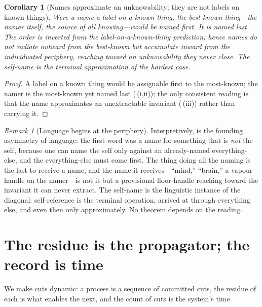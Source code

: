 \documentclass[twocolumn,11pt,a4paper]{article}
\theoremstyle{sup}
\newtheorem{corollary}[theorem]{Corollary}
\theoremstyle{definition}
\theoremstyle{remark}
\newtheorem{remark}[theorem]{Remark}
\begin{document}
\begin{corollary}[Names approximate an unknowability; they are not labels on
known things]
\label{cor:names-approx}
Were a name a label on a \emph{known} thing, the best-known thing---the namer
itself, the source of all knowing---would be named first. It is named last. The
order is inverted from the label-on-a-known-thing prediction; hence names do not
radiate outward from the best-known but accumulate inward from the individuated
periphery, reaching toward an unknowability they never close. The self-name is
the terminal approximation of the hardest case.
\end{corollary}

\begin{proof}
A label on a known thing would be assignable first to the most-known; the namer
is the most-known yet named last (\,(i,ii)); the only
consistent reading is that the name approximates an unextractable invariant
(\,(iii)) rather than carrying it.
\end{proof}

\begin{remark}[Language begins at the periphery]
\label{rem:periphery}
Interpretively,  is the founding asymmetry of language:
the first word was a name for something that is \emph{not} the self, because one
can name the self only against an already-named everything-else, and the
everything-else must come first. The thing doing all the naming is the last to
receive a name, and the name it receives---``mind,'' ``brain,'' a vapour-handle
on the namer---is not it but a provisional floor-handle reaching toward the
invariant it can never extract. The self-name is the linguistic instance of the
diagonal: self-reference is the terminal operation, arrived at through everything
else, and even then only approximately. No theorem depends on the reading.
\end{remark}

\section{The residue is the propagator; the record is time}
\label{sec:propagation}

We make cuts dynamic: a process is a sequence of committed cuts, the residue of
each is what enables the next, and the count of cuts is the system's time.
\end{document}
